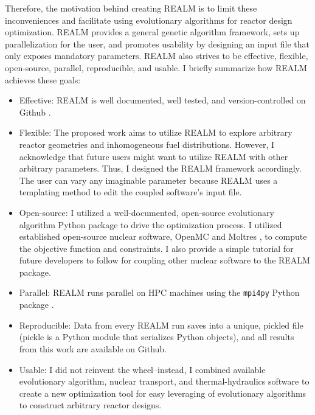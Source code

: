 Therefore, the motivation behind creating REALM is to limit these inconveniences and 
facilitate using evolutionary algorithms for reactor design optimization.
\gls{REALM} provides a general genetic algorithm framework, sets up 
parallelization for the user, and promotes usability by designing an input file 
that only exposes mandatory parameters.
REALM also strives to be effective, flexible, open-source, parallel, reproducible, 
and usable. 
I briefly summarize how \gls{REALM} achieves these goals:  
\begin{itemize}
    \item Effective: \gls{REALM} is well documented, well tested, and 
    version-controlled on Github \cite{chee_arfcrealm_2021}.
    \item Flexible: The proposed work aims to utilize \gls{REALM} to 
    explore arbitrary reactor geometries and inhomogeneous fuel distributions. 
    However, I acknowledge that future users might want to utilize \gls{REALM} 
    with other arbitrary parameters. Thus, I designed the \gls{REALM}
    framework accordingly. The user can vary any imaginable parameter 
    because \gls{REALM} uses a templating method to edit the coupled software's input 
    file.
    \item Open-source: I utilized a well-documented, open-source evolutionary algorithm 
    Python package to drive the optimization process. I utilized established 
    open-source nuclear software, OpenMC \cite{romano_openmc_2013} and 
    Moltres \cite{lindsay_introduction_2018}, to compute the objective function 
    and constraints. I also provide a simple tutorial for future developers to 
    follow for coupling other nuclear software to the \gls{REALM} package.  
    \item Parallel: \gls{REALM} runs parallel on \gls{HPC} machines using the 
    \texttt{mpi4py} Python package \cite{dalcin_mpi_2008}.
    \item Reproducible: Data from every REALM run saves into a unique, pickled 
    file (pickle is a Python module that serializes Python objects), and all 
    results from this work are available on Github. 
    \item Usable: I did not reinvent the wheel--instead, I combined available 
    evolutionary algorithm, nuclear transport, and thermal-hydraulics software 
    to create a new optimization tool for easy leveraging of evolutionary algorithms 
    to construct arbitrary reactor designs. 
\end{itemize}

